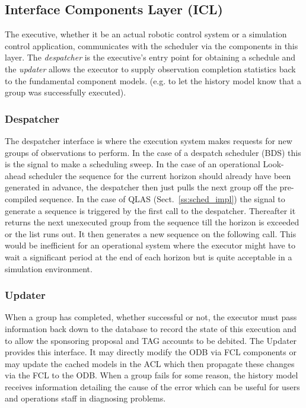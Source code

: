 \subsection{Interface Components Layer (ICL)} 
The executive, whether it be an actual robotic control system or a simulation control application, communicates with the scheduler via the components in this layer. The \emph{despatcher} is the executive's entry point for obtaining a schedule and the \emph{updater} allows the executor to supply observation completion statistics back to the fundamental component models. (e.g. to let the history model know that a group was successfully executed).

\subsubsection{Despatcher}
The despatcher interface is where the execution system makes requests for new groups of observations to perform. In the case of a despatch scheduler (BDS) this is the signal to make a scheduling sweep. In the case of an operational Look-ahead scheduler the sequence for the current horizon should already have been generated in advance, the despatcher then just pulls the next group off the pre-compiled sequence. In the case of QLAS (Sect.~\ref{ss:sched_impl}) the signal to generate a sequence is triggered by the first call to the despatcher. Thereafter it returns the next unexecuted group from the sequence till the horizon is exceeded or the list runs out. It then generates a new sequence on the following call. This would be inefficient for an operational system where the executor might have to wait a significant period at the end of each horizon but is quite acceptable in a simulation environment.

\subsubsection{Updater}
When a group has completed, whether successful or not, the executor must pass information back down to the database to record the state of this execution and to allow the sponsoring proposal and TAG accounts to be debited. The Updater provides this interface. It may directly modify the ODB via FCL components or may update the cached models in the ACL which then propagate these changes via the FCL to the ODB. When a group fails for some reason, the history model receives information detailing the cause of the error which can be useful for users and operations staff in diagnosing problems.

